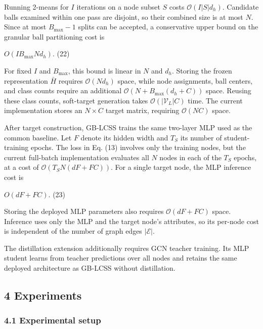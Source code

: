 Running 2-means for \(I\) iterations on a node subset \(S\) costs \(\mathcal{O}\left( I|S|d_{h} \right)\). Candidate balls examined within one pass are disjoint, so their combined size is at most \(N\). Since at most \(B_{\max} - 1\) splits can be accepted, a conservative upper bound on the granular ball partitioning cost is

\(O(IB_{\max}Nd_{h}).\) (22)

For fixed \(I\) and \(B_{\max}\), this bound is linear in \(N\) and \(d_{h}\). Storing the frozen representation \(\bar{H}\) requires \(\mathcal{O}\left( Nd_{h} \right)\) space, while node assignments, ball centers, and class counts require an additional \(\mathcal{O}\left( N + B_{\max}\left( d_{h} + C \right) \right)\) space. Reusing these class counts, soft-target generation takes \(\mathcal{O}\left( \left| \mathcal{V}_{L} \right|C \right)\) time. The current implementation stores an \(N \times C\) target matrix, requiring \(\mathcal{O}(NC)\) space.

After target construction, GB-LCSS trains the same two-layer MLP used as the common baseline. Let \(F\) denote its hidden width and \(T_{S}\) its number of student-training epochs. The loss in Eq. (13) involves only the training nodes, but the current full-batch implementation evaluates all \(N\) nodes in each of the \(T_{S}\) epochs, at a cost of \(\mathcal{O}\left( T_{S}N(dF + FC) \right)\). For a single target node, the MLP inference cost is

\(O(dF + FC).\) (23)

Storing the deployed MLP parameters also requires \(\mathcal{O}(dF + FC)\) space. Inference uses only the MLP and the target node's attributes, so its per-node cost is independent of the number of graph edges \(\left| \mathcal{E} \right|\).

The distillation extension additionally requires GCN teacher training. Its MLP student learns from teacher predictions over all nodes and retains the same deployed architecture as GB-LCSS without distillation.

\subsection{4 Experiments}\label{experiments}

\subsubsection{4.1 Experimental setup}\label{experimental-setup}

